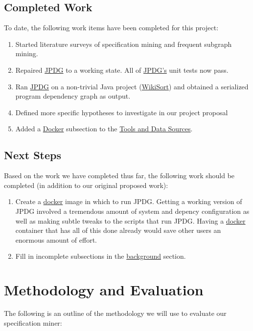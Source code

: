 \documentclass[12pt]{article}
\begin{document}
\subsection{Completed Work}
To date, the following work items have been completed for this project:

\begin{enumerate}
    \item Started literature surveys of specification mining and frequent subgraph mining.
    \item Repaired \hyperref[subsection:JPDG]{JPDG} to a working state. All of \hyperref[subsection:JPDG]{JPDG's} unit tests now pass.
    \item Ran \hyperref[subsection:JPDG]{JPDG} on a non-trivial Java project (\href{https://github.com/BonzaiThePenguin/WikiSort}{WikiSort}) and obtained a serialized program dependency graph as output.
    \item Defined more specific hypotheses to investigate in our project proposal
    \item Added a \hyperref[subsection:Docker]{Docker} subsection to the \hyperref[section:Tools and Data Sources]{Tools and Data Sources}.
\end{enumerate}

\subsection{Next Steps}
Based on the work we have completed thus far, the following work should be completed (in addition to our original proposed work):

\begin{enumerate}
    \item Create a \hyperref[subsection:Docker]{docker} image in which to run JPDG. Getting a working version of JPDG involved a tremendous amount of system and depency configuration as well as making subtle tweaks to the scripts that run JPDG. Having a \hyperref[subsection:Docker]{docker} container that has all of this done already would save other users an enormous amount of effort.
    \item Fill in incomplete subsections in the \hyperref[section:Background]{background} section.
\end{enumerate}

\section{Methodology and Evaluation}
The following is an outline of the methodology we will use to evaluate our specification miner:
\end{document}
